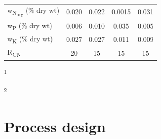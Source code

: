 \begin{refsection}[referencesCh7]
\begin{table}[h]
{\begin{tabular}{@{}lcccc@{}}
			w\textsubscript{N\textsubscript{org}} (\% dry wt) & 0.020                                                                               & 0.022                                                                                           & 0.0015                                                                                    & 0.031                                                                                  \\
			w\textsubscript{P} (\% dry wt)    & 0.006                                                                               & 0.010                                                                                           & 0.035                                                                                     & 0.005                                                                                  \\
			w\textsubscript{K} (\% dry wt)    & 0.027                                                                               & 0.027                                                                                           & 0.011                                                                                     & 0.009                                                                                  \\
			R\textsubscript{CN}               & 20                                                                                  & 15                                                                                              & 15                                                                                        & 15                                                                                     \\ \bottomrule
		\end{tabular}
	}
\begin{tablenotes}
	\footnotesize
	\item \textsuperscript{1} \protect\citet{EuropeanCommission4953_2_11768_1}
	\item \textsuperscript{2} \protect\citet{DanishEnvironmentalProtectionAgency2018}
\end{tablenotes}
\end{table}


\section{Process design}\label{section:Sec3}

\end{refsection}
